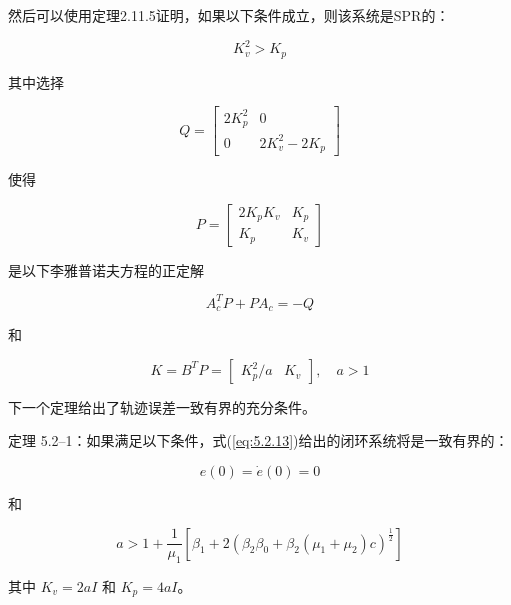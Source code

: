 \documentclass[UTF8,12pt,a4paper]{ctexart}
\begin{document}
然后可以使用定理2.11.5证明，如果以下条件成立，则该系统是SPR的：

\begin{equation}\label{eq:5.2.15}
K_v^2 > K_p
\end{equation}

其中选择

\begin{equation}\label{eq:5.2.16}
Q = \begin{bmatrix} 2K_p^2 & 0 \\ 0 & 2K_v^2 - 2K_p \end{bmatrix}
\end{equation}

使得

\begin{equation}\label{eq:5.2.17}
P = \begin{bmatrix} 2K_p K_v & K_p \\ K_p & K_v \end{bmatrix}
\end{equation}

是以下李雅普诺夫方程的正定解

\begin{equation}\label{eq:5.2.18}
A_c^T P + PA_c = -Q
\end{equation}

和

\begin{equation}\label{eq:5.2.19}
K = B^T P = \begin{bmatrix} K_p^2/a & K_v \end{bmatrix}, \quad a > 1
\end{equation}

下一个定理给出了轨迹误差一致有界的充分条件。

\begin{theorem}\label{thm:5.2.1}
定理 5.2--1：如果满足以下条件，式(\ref{eq:5.2.13})给出的闭环系统将是一致有界的：

\begin{equation}
e(0) = \dot{e}(0) = 0
\end{equation}

和

\begin{equation}
a > 1 + \frac{1}{\mu_1}[\beta_1 + 2(\beta_2\beta_0 + \beta_2(\mu_1 + \mu_2)c)^{\frac{1}{2}}]
\end{equation}

其中 $K_v = 2aI$ 和 $K_p = 4aI$。
\end{theorem}
\end{document}
